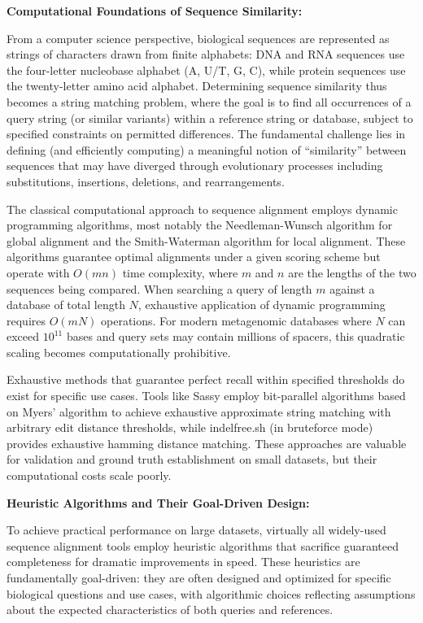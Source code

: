 \documentclass[
]{article}
\begin{document}
\textbf{Computational Foundations of Sequence Similarity:}

From a computer science perspective, biological sequences are
represented as strings of characters drawn from finite alphabets: DNA
and RNA sequences use the four-letter nucleobase alphabet (A, U/T, G,
C), while protein sequences use the twenty-letter amino acid alphabet.
Determining sequence similarity thus becomes a string matching problem,
where the goal is to find all occurrences of a query string (or similar
variants) within a reference string or database, subject to specified
constraints on permitted differences. The fundamental challenge lies in
defining (and efficiently computing) a meaningful notion of
``similarity'' between sequences that may have diverged through
evolutionary processes including substitutions, insertions, deletions,
and rearrangements.

The classical computational approach to sequence alignment employs
dynamic programming algorithms, most notably the Needleman-Wunsch
algorithm for global alignment\autocite{Needleman1970_global_alignment}
and the Smith-Waterman algorithm for local
alignment\autocite{Smith1981_local_alignment}. These algorithms
guarantee optimal alignments under a given scoring scheme but operate
with \(O( mn )\) time complexity, where \(m\) and \(n\) are the lengths
of the two sequences being compared. When searching a query of length
\(m\) against a database of total length \(N\), exhaustive application
of dynamic programming requires \(O( mN )\) operations. For modern
metagenomic databases where \(N\) can exceed \(10^{11}\) bases and query
sets may contain millions of spacers, this quadratic scaling becomes
computationally prohibitive.

Exhaustive methods that guarantee perfect recall within specified
thresholds do exist for specific use cases. Tools like Sassy employ
bit-parallel algorithms based on Myers'
algorithm\autocite{Myers1999_bitparallel} to achieve exhaustive
approximate string matching with arbitrary edit distance thresholds,
while indelfree.sh (in bruteforce mode) provides exhaustive hamming
distance matching. These approaches are valuable for validation and
ground truth establishment on small datasets, but their computational
costs scale poorly.

\textbf{Heuristic Algorithms and Their Goal-Driven Design:}

To achieve practical performance on large datasets, virtually all
widely-used sequence alignment tools employ heuristic algorithms that
sacrifice guaranteed completeness for dramatic improvements in speed.
These heuristics are fundamentally goal-driven: they are often designed
and optimized for specific biological questions and use cases, with
algorithmic choices reflecting assumptions about the expected
characteristics of both queries and references.
\end{document}
